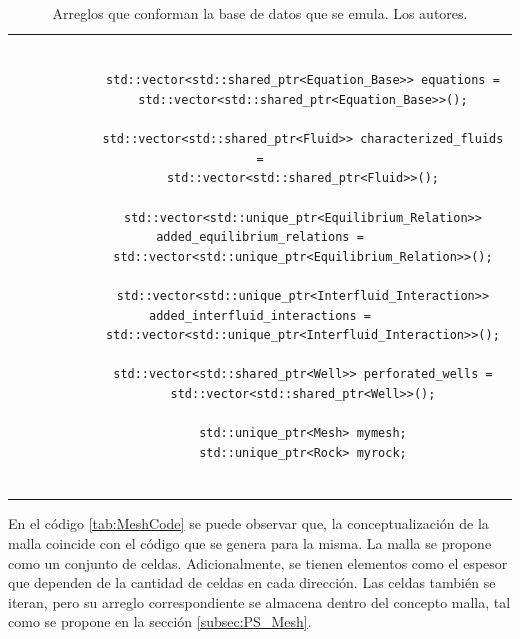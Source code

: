 \begin{table}
	\begin{tabular}{c}
		\begin{tiny}
			\begin{lstlisting}
			
			std::vector<std::shared_ptr<Equation_Base>> equations =
			std::vector<std::shared_ptr<Equation_Base>>();
			
			std::vector<std::shared_ptr<Fluid>> characterized_fluids =
			std::vector<std::shared_ptr<Fluid>>();
			
			std::vector<std::unique_ptr<Equilibrium_Relation>> added_equilibrium_relations =
			std::vector<std::unique_ptr<Equilibrium_Relation>>();
			
			std::vector<std::unique_ptr<Interfluid_Interaction>> added_interfluid_interactions =
			std::vector<std::unique_ptr<Interfluid_Interaction>>();
			
			std::vector<std::shared_ptr<Well>> perforated_wells =
			std::vector<std::shared_ptr<Well>>();
			
			std::unique_ptr<Mesh> mymesh;
			std::unique_ptr<Rock> myrock;
			
			\end{lstlisting}
		\end{tiny}
	\end{tabular}
	\label{tab:bd}
	\caption[Arreglos que conforman la base de datos que se emula.]{Arreglos que conforman la base de datos que se emula. Los autores.}
\end{table}

En el código \ref{tab:MeshCode} se puede observar que, la conceptualización de la malla coincide con el código que se genera para la misma. La malla se propone como un conjunto de celdas. Adicionalmente, se tienen elementos como el espesor que dependen de la cantidad de celdas en cada dirección. Las celdas también se iteran, pero su arreglo correspondiente se almacena dentro del concepto malla, tal como se propone en la sección \ref{subsec:PS_Mesh}.\\

